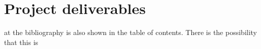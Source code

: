 \documentclass[11pt,fleqn,twoside]{article}
\begin{document}
\section{Project deliverables}

%
%
%
%
%
%



\nocite{*} %

at the bibliography is also shown in the table of contents. There is the possibility that this is \newpage
{} 

%
%

\renewcommand{\refname}{Annotated Bibliography}  %
\end{document}
